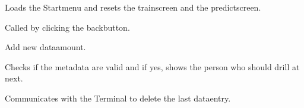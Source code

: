 \documentclass[letterpaper,10pt,english]{sphinxmanual}
\begin{document}
\begin{fulllineitems}
\begin{fulllineitems}
\label{\detokenize{anoog.automation:anoog.automation.graphical_user_interface.Train_Window.event_back}}
\sphinxAtStartPar
Loads the Startmenu and resets the train\sphinxhyphen{}screen and the predict\sphinxhyphen{}screen.

\sphinxAtStartPar
Called by clicking the back\sphinxhyphen{}button.

\end{fulllineitems}


\begin{fulllineitems}
\label{\detokenize{anoog.automation:anoog.automation.graphical_user_interface.Train_Window.event_confirm_add}}
\sphinxAtStartPar
Add new data\sphinxhyphen{}amount.

\end{fulllineitems}


\begin{fulllineitems}
\label{\detokenize{anoog.automation:anoog.automation.graphical_user_interface.Train_Window.event_confirm_init_change}}
\sphinxAtStartPar
Checks if the meta\sphinxhyphen{}data are valid and if yes, shows the person who should drill at next.

\end{fulllineitems}


\begin{fulllineitems}
\label{\detokenize{anoog.automation:anoog.automation.graphical_user_interface.Train_Window.event_delete_last_button}}
\sphinxAtStartPar
Communicates with the Terminal to delete the last data\sphinxhyphen{}entry.


\end{fulllineitems}
\end{fulllineitems}
\end{document}
